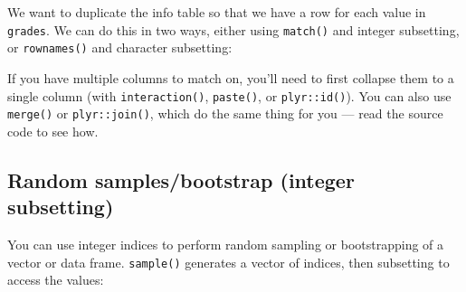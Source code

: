 We want to duplicate the info table so that we have a row for each value
in \texttt{grades}. We can do this in two ways, either using
\texttt{match()} and integer subsetting, or \texttt{rownames()} and
character subsetting: 

\begin{Shaded}
\begin{Highlighting}[]

\StringTok{ }

\StringTok{ }
\NormalTok{info[}\NormalTok{(grades), ]}
\end{Highlighting}
\end{Shaded}

If you have multiple columns to match on, you'll need to first collapse
them to a single column (with \texttt{interaction()}, \texttt{paste()},
or \texttt{plyr::id()}). You can also use \texttt{merge()} or
\texttt{plyr::join()}, which do the same thing for you --- read the
source code to see how. 

\subsection{Random samples/bootstrap (integer subsetting)}

You can use integer indices to perform random sampling or bootstrapping
of a vector or data frame. \texttt{sample()} generates a vector of
indices, then subsetting to access the values: 
  

